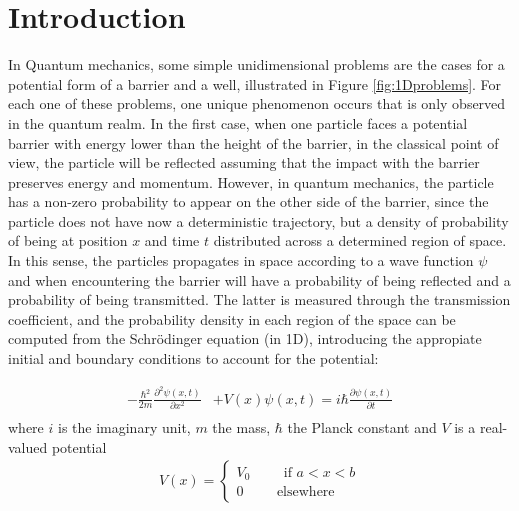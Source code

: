 \documentclass[12pt,a4paper,onecolumn]{article}
\theoremstyle{definition}
\theoremstyle{plain}
\begin{document}
\section{Introduction}
In Quantum mechanics, some simple unidimensional problems are the cases for a potential form of a barrier and a well, illustrated in Figure \ref {fig:1Dproblems}. For each one of these problems, one unique phenomenon occurs that is only observed in the quantum realm. In the first case, when one particle faces a potential barrier with energy lower than the height of the barrier, in the classical point of view, the particle will be reflected assuming that the impact with the barrier preserves energy and momentum. However, in quantum mechanics, the particle has a non-zero probability to appear on the other side of the barrier, since the particle does not have now a deterministic trajectory, but a density of probability of being at position $x$ and time $t$ distributed across a determined region of space. In this sense, the particles propagates in space according to a wave function $\psi$ and when encountering the barrier will have a probability of being reflected and a probability of being transmitted. The latter is measured through the transmission coefficient, and the probability density in each region of the space can be computed from the Schrödinger equation (in 1D), introducing the appropiate initial and boundary conditions to account for the potential: 

\begin{align}
\label{schroeq}
    -\frac{\hbar^2}{2m}\frac{\partial^2\psi(x,t)}{\partial x^2 }&+V(x)\psi(x,t)=i\hbar \frac{\partial \psi(x,t)}{\partial t} \\
\end{align}
 where $i$ is the imaginary unit, $m$ the mass, $\hbar$ the Planck constant and $V$ is a real-valued potential
\begin{align}
V(x)=
\begin{cases}
V_0\hspace{1cm} \text{if } a<x<b\\
0\hspace{1cm} \text{elsewhere}
\end{cases}
\end{align}
\end{document}

